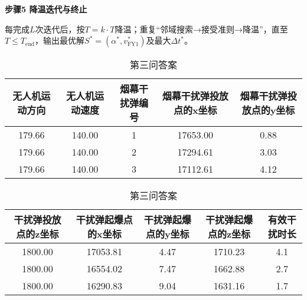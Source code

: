 \documentclass[../main.tex]{subfiles}
\begin{document}
\noindent\textbf{步骤5 降温迭代与终止}

每完成$L$次迭代后，按$T = k \cdot T$降温；重复“邻域搜索→接受准则→降温”，直至$T \leq T_{\text{end}}$，输出最优解$S^*=(\alpha^*, v_{\text{FY1}}^*)$及最大$\Delta t^*$。

\begin{table}[H]
\caption{第三问答案}
\label{tab:001} 
\centering
\begin{small}
\begin{tabular}{ccccc}
\toprule[1.5pt]
无人机运动方向 & 无人机运动速度 & 烟幕干扰弹编号 & 烟幕干扰弹投放点的x坐标& 烟幕干扰弹投放点的y坐标 \\
\midrule[1pt]
  179.66           &140.00                  & 1     & 17653.00                   & 0.88     \\            
  179.66           &140.00                  & 2     & 17294.61                   & 3.03      \\           
  179.66          &140.00                  & 3     & 17112.61                   & 4.12      \\           
\bottomrule[1.5pt]
\end{tabular}
\end{small}
\end{table}


\begin{table}[H]
\caption{第三问答案}
\label{tab:031} 
\centering
\begin{small}
\begin{tabular}{ccccc}
\toprule[1.5pt]
    干扰弹投放点的z坐标 &干扰弹起爆点的x坐标&干扰弹起爆点的y坐标&干扰弹起爆点的z坐标&有效干扰时长\\
\midrule[1pt]
1800.00             &17053.81                   & 4.47    &1710.23        & 4.1  \\               
1800.00             &16554.02                   & 7.47    & 1662.88       & 2.7  \\               
1800.00             &16290.83                   & 9.04    & 1631.16       & 1.7  \\                
\bottomrule[1.5pt]
\end{tabular}
\end{small}
\end{table}
\end{document}
